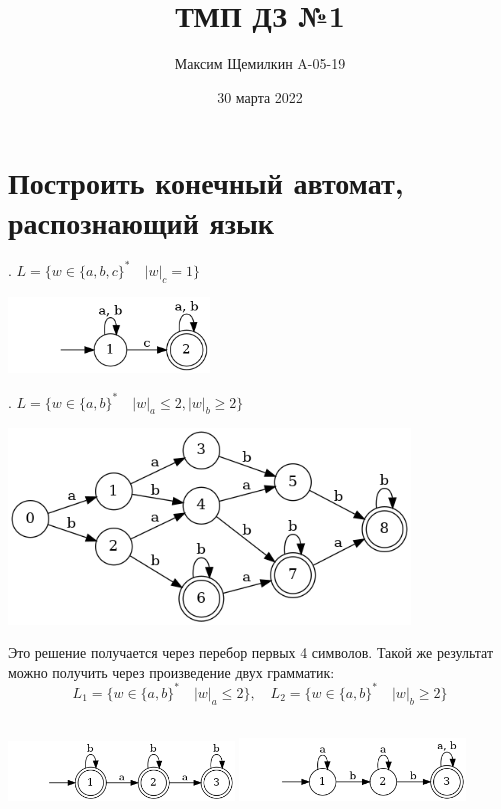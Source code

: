 \documentclass{article}
\title{ТМП ДЗ №1}
\author{Максим Щемилкин A-05-19}
\date{30 марта 2022}
\begin{document}
\maketitle
\section{Построить конечный автомат, распознающий язык}


    . $L = \{w \in \{a, b, c\}^*\quad|w|_c = 1\}$
    \begin{center}
        \includegraphics[width=0.4\textwidth]{pic1.dot}
    \end{center}
    . $L = \{w \in \{a, b\}^* \quad |w|_a \leq 2, |w|_b \geq 2\}$
    \begin{center}
        \includegraphics[width=0.8\textwidth]{pic2.dot}\\
    \end{center}
    Это решение получается через перебор первых 4 символов. Такой же результат можно получить через произведение двух грамматик:\\
    $$L_1 = \{w \in \{a, b\}^* \quad |w|_a \leq 2\}, \quad L_2 = \{w \in \{a, b\}^* \quad |w|_b \geq 2\}$$\\
    \begin{center}
        \includegraphics[width=0.45\textwidth]{pic3.dot}
        \includegraphics[width=0.45\textwidth]{pic4.dot}
    \end{center}
\end{document}
